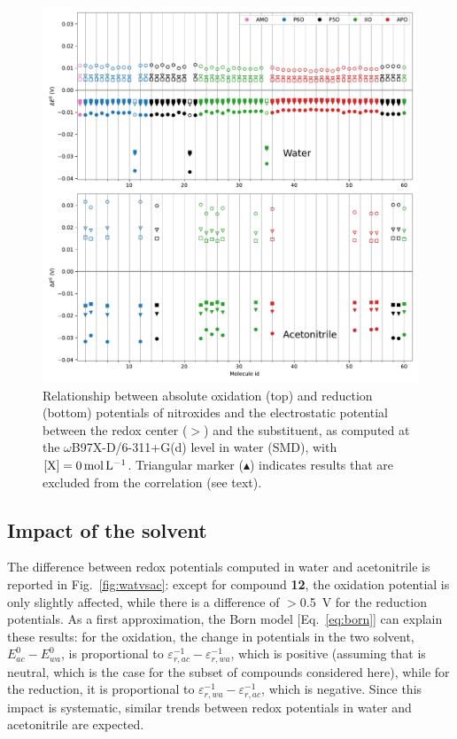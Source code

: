\documentclass[review]{elsarticle}
\begin{document}
\begin{figure}[!h]
\centering
\includegraphics[width=\linewidth]{Figure8}
\caption{Relationship between absolute oxidation (top) and reduction (bottom) potentials of nitroxides and the electrostatic potential between the redox center ($>$) and the substituent, as computed at the $\omega$B97X-D/6-311+G(d) level in water (SMD), with $[\ce{X}]=\SI{0}{\mole\per\liter}$. Triangular marker ($\blacktriangle$) indicates results that are excluded from the correlation (see text).}
\label{fig:corr} 
\end{figure}

\clearpage

\subsection{Impact of the solvent}

The difference between redox potentials computed in water and acetonitrile is reported in Fig.~\ref{fig:watvsac}: except for compound \textbf{12}, the oxidation potential is only slightly affected, while there is a difference of $>$\SI{0.5}{\volt} for the reduction potentials. As a first approximation, the Born model [Eq.~\eqref{eq:born}] can explain these results: for the oxidation, the change in potentials in the two solvent, $E^0_{ac} - E^0_{wa}$, is proportional to $ \varepsilon_{r,ac}^{-1}-\varepsilon_{r,wa}^{-1}$, which is positive (assuming that  is neutral, which is the case for the subset of compounds considered here), while for the reduction, it is proportional to $ \varepsilon_{r,wa}^{-1}-\varepsilon_{r,ac}^{-1}$, which is negative.  Since this impact is systematic, similar trends between redox potentials in water and acetonitrile are expected.
\end{document}
